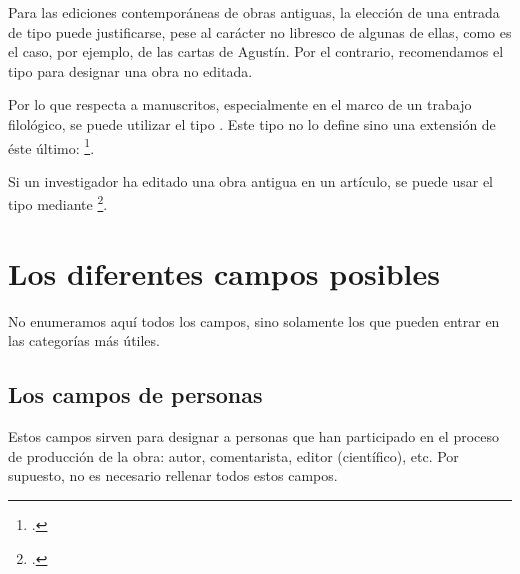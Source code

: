 Para las ediciones contemporáneas de obras antiguas, la elección de
una entrada de tipo  puede justificarse, pese al carácter
no libresco de algunas de ellas, como es el caso, por ejemplo, de las
cartas de Agustín. Por el contrario, recomendamos el tipo
 para designar una obra no editada.

\begin{plusloins}
  Por lo que respecta a manuscritos, especialmente en el marco de un
  trabajo filológico, se puede utilizar el tipo
  . Este tipo no lo define   sino
  una extensión de éste último:
  \footcite{biblatex-manuscripts-philology}.

  Si un investigador ha editado una obra antigua en un artículo, se
  puede usar el tipo  mediante
  \footcite{biblatex-bookinarticle}.
\end{plusloins}

\section{Los diferentes campos posibles}

No enumeramos aquí todos los campos, sino solamente los que pueden
entrar en las categorías más útiles.

\subsection{Los campos de personas}

Estos campos sirven para designar a personas que han participado en el
proceso de producción de la obra: autor, comentarista, editor
(científico), etc. Por supuesto, no es necesario rellenar todos estos campos.

